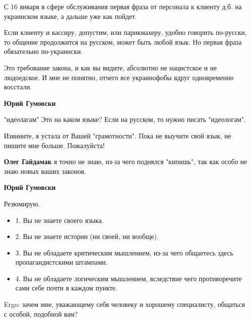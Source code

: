 \begin{itemize}
\begin{itemize}
С 16 января в сфере обслуживания первая фраза от персонала к клиенту д.б. на
украинском языке, а дальше уже как пойдет.

Если клиенту и кассиру, допустим, или парикмахеру, удобно говорить по-русски,
то общение продолжится на русском, может быть любой язык. Но первая фраза
обязательно по-украински.

Это требование закона, и как вы видите, абсолютно не нацистское и не
людоедское. И мне не понятно, отчего все украинофобы вдруг одновременно
восстали.



\textbf{Юрий Гумовски} 

"идеолагам" Это на каком языке? Если на русском, то нужно писать "идеологам". 

Извините, я устала от Вашей "грамотности". Пока не выучите свой язык, не пишите
мне больше. Пожалуйста!


\textbf{Олег Гайдамак} я точно не знаю, из-за чего поднялся "кипишь", так как особо не знаю новых ваших законов.


\textbf{Юрий Гумовски} 

Резюмирую.

\begin{itemize}
  \item 1. Вы не знаете своего языка.
  \item 2. Вы не знаете истории (ни своей, ни вообще).
  \item 3. Вы не обладаете критическим мышлением, из-за чего общаетесь здесь пропагандистскими штампами.
  \item 4. Вы не обладаете логическим мышлением, вследствие чего противоречите сами себе почти в каждом пункте.
\end{itemize}

Ergo: зачем мне, уважающему себя человеку и хорошему специалисту, общаться с
особой, подобной вам?



\end{itemize}
\end{itemize}
